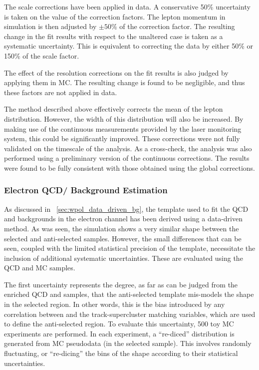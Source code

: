 The scale corrections have been applied in data. A conservative 50\% uncertainty
is taken on the value of the correction factors. The lepton momentum in
simulation is then adjusted by $\pm 50\%$ of the correction factor. The
resulting change in the fit results with respect to the unaltered case is taken
as a systematic uncertainty. This is equivalent to correcting the data by either
50\% or 150\% of the scale factor.

The effect of the resolution corrections on the fit results is also judged by
applying them in \ac{MC}. The resulting change is found to be negligible,
and thus these factors are not applied in data.

The method described above effectively corrects the mean of the lepton \Pt
distribution. However, the width of this distribution will also be increased. By
making use of the continuous measurements provided by the laser monitoring
system, this could be significantly improved. These corrections were not fully
validated on the timescale of the analysis. As a cross-check, the analysis was
also performed using a preliminary version of the continuous corrections. The
results were found to be fully consistent with those obtained using the global
corrections.

\subsubsection[Electron \ac{QCD}/\gammajets Background Estimation]{Electron \ac{QCD}/\boldmath{\gammajets} Background Estimation}
\label{sec:wpol_syst_ele_bgest}
As discussed in \sec~\ref{sec:wpol_data_driven_bg}, the template used to fit the
\ac{QCD} and \gammajets backgrounds in the electron channel has been derived
using a data-driven method. As was seen, the simulation shows a very similar \LP
shape between the selected and anti-selected samples. However, the small
differences that can be seen, coupled with the limited statistical precision of
the template, necessitate the inclusion of additional systematic
uncertainties. These are evaluated using the \ac{QCD} and \gammajets \ac{MC}
samples.

The first uncertainty represents the degree, as far as can be judged from the
enriched \ac{QCD} and \gammajets samples, that the anti-selected template
mis-models the \LP shape in the selected region. In other words, this is the
bias introduced by any correlation between \LP and the track-supercluster
matching variables, which are used to define the anti-selected region. To
evaluate this uncertainty, 500 toy \ac{MC} experiments are performed. In each
experiment, a ``re-diced'' \LP distribution is generated from \ac{MC} pseudodata
(in the selected sample). This involves randomly fluctuating, or ``re-dicing''
the bins of the \LP shape according to their statistical uncertainties.

